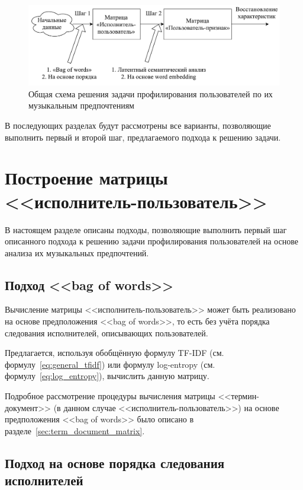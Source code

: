 \begin{figure}[!h]
\caption{Общая схема решения задачи профилирования пользователей
         по их музыкальным предпочтениям}
\label{fig:general_approach}
\centering
\includegraphics[width=\textwidth]{figs/general-approach.pdf}
\end{figure}

В последующих разделах будут рассмотрены все варианты,
позволяющие выполнить первый и второй шаг, предлагаемого
подхода к решению задачи.

\section{Построение матрицы <<исполнитель-пользователь>>}
\label{sec:step1_artist_user_matrix}

В настоящем разделе описаны подходы, позволяющие выполнить
первый шаг описанного подхода к решению задачи профилирования
пользователей на основе анализа их музыкальных предпочтений.

\subsection{Подход <<bag of words>>}

Вычисление матрицы <<исполнитель-пользователь>> может быть
реализовано на основе предположения <<bag of words>>, то есть
без учёта порядка следования исполнителей, описывающих пользователей.

Предлагается, используя обобщённую формулу TF-IDF 
(см. формулу~\ref{eq:general_tfidf}) или формулу log-entropy
(см. формулу~\ref{eq:log_entropy}), вычислить данную матрицу.

Подробное рассмотрение процедуры вычисления матрицы <<термин-документ>>
(в данном случае <<исполнитель-пользователь>>) на основе
предположения <<bag of words>> было описано в 
разделе~\ref{sec:term_document_matrix}.

\subsection{Подход на основе порядка следования исполнителей}


